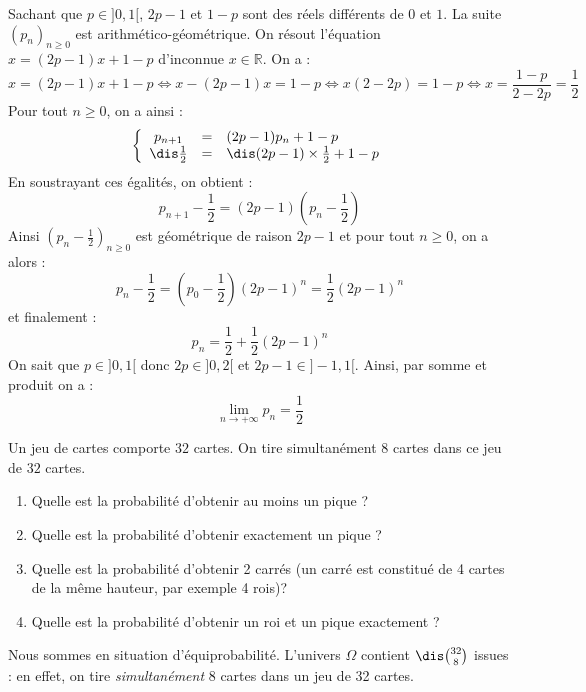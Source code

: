 \documentclass[a4paper,10pt]{report}
\begin{document}
\medskip

\noindent Sachant que $p \in ]0,1[$, $2p-1$ et $1-p$ sont des réels différents de $0$ et $1$. La suite $(p_n)_{n \geq 0}$ est arithmético-géométrique. On résout l'équation $x=(2p-1)x+1-p$ d'inconnue $x \in \mathbb{R}$. On a :
\[ x= (2p-1)x+1-p \Longleftrightarrow x-(2p-1)x=1-p \Longleftrightarrow x(2-2p)= 1-p \Longleftrightarrow x = \frac{1-p}{2-2p} = \frac{1}{2} \]
Pour tout $n \geq 0$, on a ainsi :
\[ \left\lbrace \begin{array}{ccl}
p_{n+1} & = & (2p-1)p_n+1-p \\
\dis \frac{1}{2} & = & \dis(2p-1) \times \frac{1}{2} + 1-p \\
\end{array}\right.\]
En soustrayant ces égalités, on obtient :
\[ p_{n+1} - \frac{1}{2} = (2p-1)\left(p_n - \frac{1}{2} \right) \]
Ainsi $\left( p_n - \frac{1}{2} \right)_{n \geq 0}$ est géométrique de raison $2p-1$ et pour tout $n \geq 0$, on a alors :
\[ p_n - \frac{1}{2} = \left( p_0 - \frac{1}{2} \right) (2p-1)^n =  \frac{1}{2} (2p-1)^n \]
et finalement :
\[ p_n = \frac{1}{2} + \frac{1}{2} (2p-1)^n \]
On sait que $p \in ]0,1[$ donc $2p \in ]0,2[$ et $2p-1 \in ]-1,1[$. Ainsi, par somme et produit on a :
\[ \lim_{n \rightarrow + \infty} p_n = \frac{1}{2} \]

\begin{Exercice}{} Un jeu de cartes comporte $32$ cartes. On tire simultanément $8$ cartes dans ce jeu de $32$ cartes. 

\begin{enumerate}
\item Quelle est la probabilité d'obtenir au moins un pique ?
\item Quelle est la probabilité d'obtenir exactement un pique ?
\item Quelle est la probabilité d'obtenir 2 carrés (un carré est constitué de 4 cartes de la même hauteur, par exemple 4 rois)?
\item Quelle est la probabilité d'obtenir un roi et un pique exactement ?
\end{enumerate}
\end{Exercice} 

\corr Nous sommes en situation d'équiprobabilité. L'univers $\Omega$ contient $\dis \binom{32}{8}$ issues : en effet, on tire \textit{simultanément} 8 cartes dans un jeu de 32 cartes.
\end{document}
